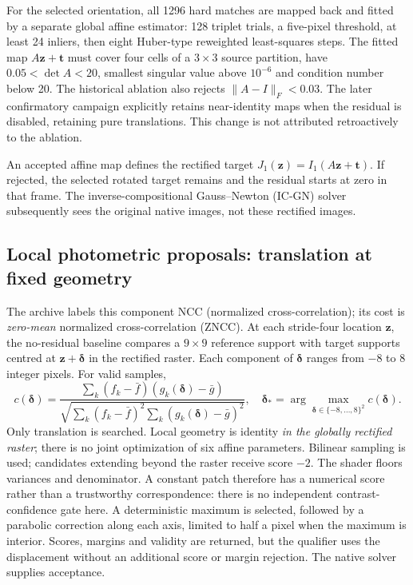 For the selected orientation, all 1296 hard matches are mapped back and fitted by a separate global affine estimator: 128 triplet trials, a five-pixel threshold, at least 24 inliers, then eight Huber-type reweighted least-squares steps. The fitted map $A\mathbf z+\mathbf t$ must cover four cells of a $3\times3$ source partition, have $0.05<\det A<20$, smallest singular value above $10^{-6}$ and condition number below 20. The historical ablation also rejects $\|A-I\|_F<0.03$. The later confirmatory campaign explicitly retains near-identity maps when the residual is disabled, retaining pure translations. This change is not attributed retroactively to the ablation.

An accepted affine map defines the rectified target $J_1(\mathbf z)=I_1(A\mathbf z+\mathbf t)$. If rejected, the selected rotated target remains and the residual starts at zero in that frame. The inverse-compositional Gauss--Newton (IC-GN) solver subsequently sees the original native images, not these rectified images.

\subsection{Local photometric proposals: translation at fixed geometry}
The archive labels this component NCC (normalized cross-correlation); its cost is \emph{zero-mean} normalized cross-correlation (ZNCC). At each stride-four location $\mathbf z$, the no-residual baseline compares a $9\times9$ reference support with target supports centred at $\mathbf z+\boldsymbol\delta$ in the rectified raster. Each component of $\boldsymbol\delta$ ranges from $-8$ to $8$ integer pixels. For valid samples,
\begin{equation}
c(\boldsymbol\delta)=\frac{\sum_k(f_k-\bar f)(g_k(\boldsymbol\delta)-\bar g)}
{\sqrt{\sum_k(f_k-\bar f)^2\sum_k(g_k(\boldsymbol\delta)-\bar g)^2}},\quad
\boldsymbol\delta_* = \arg\max_{\boldsymbol\delta\in\{-8,\ldots,8\}^2}c(\boldsymbol\delta).
\label{eq:localncc}
\end{equation}
Only translation is searched. Local geometry is identity \emph{in the globally rectified raster}; there is no joint optimization of six affine parameters. Bilinear sampling is used; candidates extending beyond the raster receive score $-2$. The shader floors variances and denominator. A constant patch therefore has a numerical score rather than a trustworthy correspondence: there is no independent contrast-confidence gate here. A deterministic maximum is selected, followed by a parabolic correction along each axis, limited to half a pixel when the maximum is interior. Scores, margins and validity are returned, but the qualifier uses the displacement without an additional score or margin rejection. The native solver supplies acceptance.

